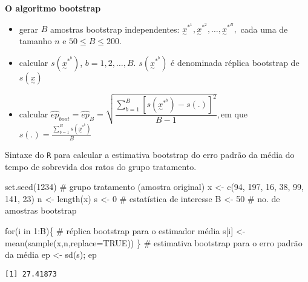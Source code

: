 \documentclass[
  letterpaper,
  DIV=11,
  numbers=noendperiod]{scrreprt}
\newenvironment{Shaded}{\begin{snugshade}}{\end{snugshade}}
\newcommand{\AttributeTok}[1]{\textcolor[rgb]{0.40,0.45,0.13}{#1}}
\newcommand{\CommentTok}[1]{\textcolor[rgb]{0.37,0.37,0.37}{#1}}
\newcommand{\ConstantTok}[1]{\textcolor[rgb]{0.56,0.35,0.01}{#1}}
\newcommand{\ControlFlowTok}[1]{\textcolor[rgb]{0.00,0.23,0.31}{#1}}
\newcommand{\DecValTok}[1]{\textcolor[rgb]{0.68,0.00,0.00}{#1}}
\newcommand{\FunctionTok}[1]{\textcolor[rgb]{0.28,0.35,0.67}{#1}}
\newcommand{\NormalTok}[1]{\textcolor[rgb]{0.00,0.23,0.31}{#1}}
\newcommand{\OtherTok}[1]{\textcolor[rgb]{0.00,0.23,0.31}{#1}}
\newcommand{\SpecialCharTok}[1]{\textcolor[rgb]{0.37,0.37,0.37}{#1}}
\begin{document}
\textbf{O algoritmo bootstrap}

\begin{itemize}
\item
  gerar \(B\) amostras bootstrap independentes:
  \(\underset{\sim}{x}^{*^{1}}, \underset{\sim}{x}^{*^{2}}, \ldots, \underset{\sim}{x}^{*^{B}},\)
  cada uma de tamanho \(n\) e \(50 \leq B \leq 200\).
\item
  calcular \(s(\underset{\sim}{x}^{*^{b}})\), \(b=1, 2, \ldots, B\).
  \(s(\underset{\sim}{x}^{*^{b}})\) é denominada réplica bootstrap de
  \(s(\underset{\sim}{x})\)
\item
  calcular
  \(\hat{ep}_{boot}=\hat{ep}_{B}=\sqrt{ \dfrac{\sum_{b=1}^{B}[s(\underset{\sim}{x}^{*^{b}})-s(.)]^2}{B-1}},\)em
  que \(s(.)=\frac{\sum_{b=1}^{B}s(\underset{\sim}{x}^{*^{b}})}{B}\)
\end{itemize}

Sintaxe do \texttt{R} para calcular a estimativa bootstrap do erro
padrão da média do tempo de sobrevida dos ratos do grupo tratamento.

\begin{Shaded}
\begin{Highlighting}[]
\FunctionTok{set.seed}\NormalTok{(}\DecValTok{1234}\NormalTok{)}
\CommentTok{\# grupo tratamento (amostra original)}
\NormalTok{x }\OtherTok{\textless{}{-}} \FunctionTok{c}\NormalTok{(}\DecValTok{94}\NormalTok{, }\DecValTok{197}\NormalTok{, }\DecValTok{16}\NormalTok{, }\DecValTok{38}\NormalTok{, }\DecValTok{99}\NormalTok{, }\DecValTok{141}\NormalTok{, }\DecValTok{23}\NormalTok{) }
\NormalTok{n }\OtherTok{\textless{}{-}} \FunctionTok{length}\NormalTok{(x)}
\NormalTok{s }\OtherTok{\textless{}{-}} \DecValTok{0}  \CommentTok{\# estatística de interesse}
\NormalTok{B }\OtherTok{\textless{}{-}} \DecValTok{50} \CommentTok{\# no. de amostras bootstrap }

\ControlFlowTok{for}\NormalTok{(i }\ControlFlowTok{in} \DecValTok{1}\SpecialCharTok{:}\NormalTok{B)\{}
   \CommentTok{\# réplica bootstrap para o estimador média}
\NormalTok{   s[i] }\OtherTok{\textless{}{-}} \FunctionTok{mean}\NormalTok{(}\FunctionTok{sample}\NormalTok{(x,n,}\AttributeTok{replace=}\ConstantTok{TRUE}\NormalTok{)) }
\NormalTok{ \}}
\CommentTok{\# estimativa bootstrap para o erro padrão da média}
\NormalTok{ep }\OtherTok{\textless{}{-}}  \FunctionTok{sd}\NormalTok{(s); ep}
\end{Highlighting}
\end{Shaded}

\begin{verbatim}
[1] 27.41873
\end{verbatim}
\end{document}
